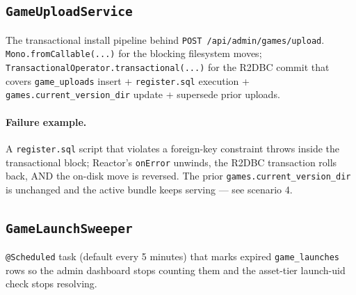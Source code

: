\subsection{\texttt{GameUploadService}}
The transactional install pipeline behind
\texttt{POST /api/admin/games/upload}.
\texttt{Mono.fromCallable(...)} for the blocking filesystem moves;
\texttt{TransactionalOperator.transactional(...)} for the R2DBC commit
that covers \texttt{game\_uploads} insert + \texttt{register.sql}
execution + \texttt{games.current\_version\_dir} update + supersede
prior uploads.


\paragraph{Failure example.}
A \texttt{register.sql} script that violates a foreign-key constraint
throws inside the transactional block; Reactor's \texttt{onError}
unwinds, the R2DBC transaction rolls back, AND the on-disk move is
reversed. The prior \texttt{games.current\_version\_dir} is unchanged
and the active bundle keeps serving — see scenario 4.

\subsection{\texttt{GameLaunchSweeper}}
\texttt{@Scheduled} task (default every 5 minutes) that marks expired
\texttt{game\_launches} rows so the admin dashboard stops counting them
and the asset-tier launch-uid check stops resolving.


